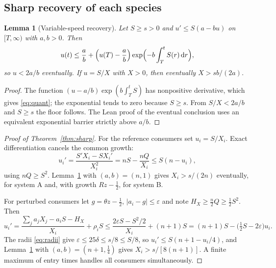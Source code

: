 \documentclass[11pt,a4paper]{article}
\theoremstyle{plain}
\newtheorem{lemma}[theorem]{Lemma}
\theoremstyle{definition}
\theoremstyle{remark}
\newcommand{\eps}{\varepsilon}
\newcommand{\dd}{\mathrm d}
\begin{document}
\subsection{Sharp recovery of each species}\label{sec:sharp}
\begin{lemma}[Variable-speed recovery]\label{lem:recovery}
Let $S\ge s>0$ and $u'\le S(a-bu)$ on $[T,\infty)$ with $a,b>0$. Then
\begin{equation}\label{eq:quant}
u(t)\le\frac ab+\Bigl(u(T)-\frac ab\Bigr)\exp\Bigl(-b\int_T^tS(r)\,\dd r\Bigr),
\end{equation}
so $u<2a/b$ eventually. If $u=S/X$ with $X>0$, then eventually $X>sb/(2a)$.
\end{lemma}
\begin{proof}
The function $(u-a/b)\exp(b\int_T^tS)$ has nonpositive derivative, which gives \eqref{eq:quant}; the exponential tends to zero because $S\ge s$. From $S/X<2a/b$ and $S\ge s$ the floor follows. The Lean proof of the eventual conclusion uses an equivalent exponential barrier strictly above $a/b$.
\end{proof}

\begin{proof}[Proof of Theorem~\ref{thm:sharp}]
For the reference consumers set $u_i=S/X_i$. Exact differentiation cancels the common growth:
\begin{equation}\label{eq:quotient}
u_i'=\frac{S'X_i-SX_i'}{X_i^2}=nS-\frac{nQ}{X_i}\le S(n-u_i),
\end{equation}
using $nQ\ge S^2$. Lemma~\ref{lem:recovery} with $(a,b)=(n,1)$ gives $X_i>s/(2n)$ eventually, for system A and, with growth $Rz-\tfrac12$, for system B.

For perturbed consumers let $g=\theta z-\tfrac12$, $|a_i-g|\le\eps$ and note $H_X\ge\tfrac n2Q\ge\tfrac12S^2$. Then
\begin{equation}\label{eq:pertquotient}
u_i'=\frac{\sum_ja_jX_j-a_iS-H_X}{X_i}+\rho_iS\le\frac{2\eps S-S^2/2}{X_i}+(n+1)S
=(n+1)S-\bigl(\tfrac12S-2\eps\bigr)u_i .
\end{equation}
The radii \eqref{eq:radii} give $\eps\le25\delta\le s/8\le S/8$, so $u_i'\le S(n+1-u_i/4)$, and Lemma~\ref{lem:recovery} with $(a,b)=(n+1,\tfrac14)$ gives $X_i>s/[8(n+1)]$. A finite maximum of entry times handles all consumers simultaneously.
\end{proof}
\end{document}
